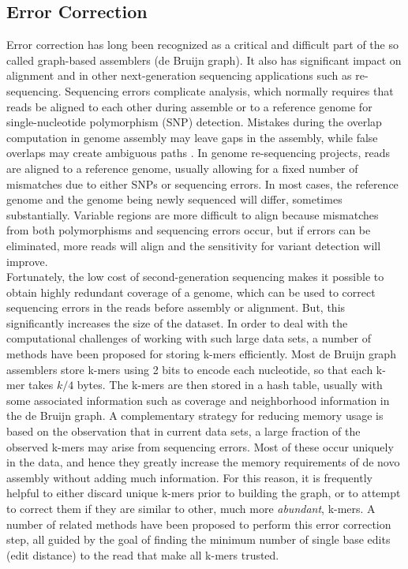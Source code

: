 \documentclass[11pt]{article}
\begin{document}
\subsection{Error Correction \label{ec}}
Error correction has long been recognized as a critical and difficult part of the so called graph-based assemblers (de Bruijn graph). It also has significant impact on alignment and in other next-generation sequencing applications such as re-sequencing. Sequencing errors complicate analysis, which normally requires that reads be aligned to each other during assemble or to a reference genome for single-nucleotide polymorphism (SNP) detection. Mistakes during the overlap computation in genome assembly may leave gaps in the assembly, while false overlaps may create ambiguous paths \cite{quake}. In genome re-sequencing projects, reads are aligned to a reference genome, usually allowing for a fixed number of mismatches due to either SNPs or sequencing errors. In most cases, the reference genome and the genome being newly sequenced will differ, sometimes substantially. Variable regions are more difficult to align because mismatches from both polymorphisms and sequencing errors occur, but if errors can be eliminated, more reads will align and the sensitivity for variant detection will improve.\\

Fortunately, the low cost of second-generation sequencing makes it possible to obtain highly redundant coverage of a genome, which can be used to correct sequencing errors in the reads before assembly or alignment. But, this significantly increases the size of the dataset. In order to deal with the computational challenges of working with such large data sets, a number of methods have been proposed for storing k-mers efficiently. Most de Bruijn graph assemblers store k-mers using 2 bits to encode each nucleotide, so that each k-mer takes $k/4$ bytes. The k-mers are then stored in a hash table, usually with some associated information such as coverage and neighborhood information in the de Bruijn graph. A complementary strategy for reducing memory usage is based on the observation that in current data sets, a large fraction of the observed k-mers may arise from sequencing errors. Most of these occur uniquely in the data, and hence they greatly increase the memory requirements of de novo assembly without adding much information. For this reason, it is frequently helpful to either discard unique k-mers prior to building the graph, or to attempt to correct them if they are similar to other, much more \emph{abundant}, k-mers. A number of related methods have been proposed to perform this error correction step, all guided by the goal of finding the minimum number of single base edits (edit distance) to the read that make all k-mers trusted.\\
\end{document}
